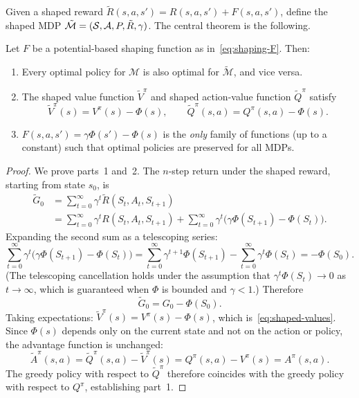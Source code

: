 Given a shaped reward $\tilde{R}(s,a,s') = R(s,a,s') + F(s,a,s')$, define the shaped MDP $\tilde{\mathcal{M}} = (\mathcal{S}, \mathcal{A}, P, \tilde{R}, \gamma)$. The central theorem is the following.

\begin{theorem}
\label{thm:shaping}
Let $F$ be a potential-based shaping function as in~\eqref{eq:shaping-F}. Then:
\begin{enumerate}
  \item Every optimal policy for $\mathcal{M}$ is also optimal for $\tilde{\mathcal{M}}$, and vice versa.
  \item The shaped value function $\tilde{V}^\pi$ and shaped action-value function $\tilde{Q}^\pi$ satisfy
    \begin{equation}
    \label{eq:shaped-values}
    \tilde{V}^\pi(s) = V^\pi(s) - \Phi(s), \qquad
    \tilde{Q}^\pi(s,a) = Q^\pi(s,a) - \Phi(s).
    \end{equation}
  \item $F(s,a,s') = \gamma\Phi(s') - \Phi(s)$ is the \emph{only} family of functions (up to a constant) such that optimal policies are preserved for all MDPs.
\end{enumerate}
\end{theorem}

\begin{proof}
We prove parts~1 and~2. The $n$-step return under the shaped reward, starting from state $s_0$, is
\begin{align*}
\tilde{G}_0 &= \sum_{t=0}^{\infty} \gamma^t \tilde{R}(S_t, A_t, S_{t+1}) \\
&= \sum_{t=0}^{\infty} \gamma^t R(S_t, A_t, S_{t+1})
   + \sum_{t=0}^{\infty} \gamma^t \bigl(\gamma\Phi(S_{t+1}) - \Phi(S_t)\bigr).
\end{align*}
Expanding the second sum as a telescoping series:
\[
\sum_{t=0}^{\infty} \gamma^t \bigl(\gamma\Phi(S_{t+1}) - \Phi(S_t)\bigr)
= \sum_{t=0}^{\infty} \gamma^{t+1}\Phi(S_{t+1}) - \sum_{t=0}^{\infty} \gamma^t\Phi(S_t)
= -\Phi(S_0).
\]
(The telescoping cancellation holds under the assumption that $\gamma^t \Phi(S_t) \to 0$ as $t\to\infty$, which is guaranteed when $\Phi$ is bounded and $\gamma < 1$.) Therefore
\begin{equation}
\label{eq:shaping-return}
\tilde{G}_0 = G_0 - \Phi(S_0).
\end{equation}
Taking expectations: $\tilde{V}^\pi(s) = V^\pi(s) - \Phi(s)$, which is~\eqref{eq:shaped-values}. Since $\Phi(s)$ depends only on the current state and not on the action or policy, the advantage function is unchanged:
\[
\tilde{A}^\pi(s,a) = \tilde{Q}^\pi(s,a) - \tilde{V}^\pi(s) = Q^\pi(s,a) - V^\pi(s) = A^\pi(s,a).
\]
The greedy policy with respect to $\tilde{Q}^\pi$ therefore coincides with the greedy policy with respect to $Q^\pi$, establishing part~1.
\end{proof}

